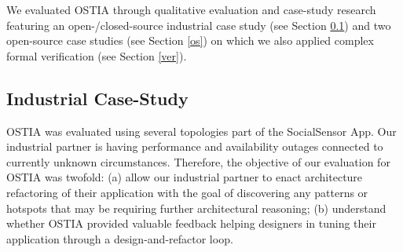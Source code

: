 
We evaluated OSTIA through qualitative evaluation and case-study research featuring an open-/closed-source industrial case study (see Section \ref{cs}) and two open-source case studies (see Section \ref{os}) on which we also applied complex formal verification (see Section \ref{ver}).

\subsection{Industrial Case-Study}\label{cs}

OSTIA was evaluated using several topologies part of the SocialSensor App. Our industrial partner is having
performance and availability outages connected to currently unknown
circumstances. Therefore, the objective of our evaluation for OSTIA was twofold:
(a) allow our industrial partner to enact architecture refactoring of their
application with the goal of discovering any patterns or hotspots that may be
requiring further architectural reasoning; (b) understand whether OSTIA provided
valuable feedback helping designers in tuning their application through a design-and-refactor loop.%


